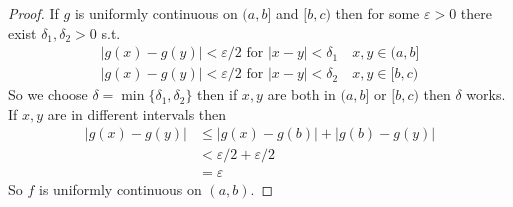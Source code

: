 \begin{proof}
    If $g$ is uniformly continuous on $(a,b]$ and $[b,c)$ then 
    for some $\varepsilon>0$ there exist $\delta_1, \delta_2>0$ s.t. 
    \begin{gather*}
        |g(x) - g(y)| < \varepsilon/2 \text{ for } |x-y| < \delta_1 \quad x, y\in (a,b] \\
        |g(x) - g(y)| < \varepsilon/2 \text{ for } |x-y| < \delta_2 \quad x, y\in [b,c)
    \end{gather*}
    So we choose $\delta = \min\{\delta_1, \delta_2\}$ then if $x,y$ are 
    both in $(a,b]$ or $[b,c)$ then $\delta$ works. If $x,y$ are in different 
    intervals then 
    \begin{align*}
        |g(x)-g(y)| &\leq |g(x)-g(b)| + |g(b)-g(y)| \\
                    &< \varepsilon/2 + \varepsilon/2 \\
                    &= \varepsilon
    \end{align*}
    So $f$ is uniformly continuous on $(a,b)$.
\end{proof}

